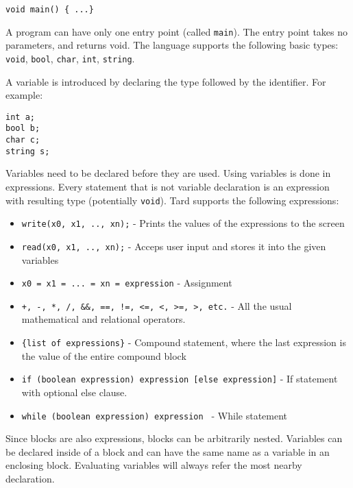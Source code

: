 \documentclass{report}
\begin{document}
\begin{center}
    \texttt{void main() \{ ...\} }
\end{center}

A program can have only one entry point (called \texttt{main}). The
entry point takes no parameters, and returns void. The language
supports the following basic types: \texttt{void}, \texttt{bool},
\texttt{char}, \texttt{int}, \texttt{string}.

A variable is introduced by declaring the type followed by the
identifier. For example:

\begin{center}
    \texttt{int a;\\bool b;\\char c;\\string s;\\}
\end{center}

Variables need to be declared before they are used. Using variables
is done in expressions. Every statement that is not variable
declaration is an expression with resulting type (potentially
\texttt{void}). Tard supports the following expressions:

\begin{itemize}
    \item \texttt{write(x0, x1, .., xn);} - Prints the values of the expressions to the screen
    \item \texttt{read(x0, x1, .., xn);} - Acceps user input and stores it into the given variables
    \item \texttt{x0 = x1 = ... = xn = expression} - Assignment
    \item \texttt{+, -, *, /, \&\&, ==, !=, <=, <, >=, >, etc.} - All the usual mathematical and relational operators.
    \item \texttt{\{list of expressions\}} - Compound statement, where the last expression is the value of the entire compound block
    \item \texttt{if (boolean expression) expression [else expression]} - If statement with optional else clause.
    \item \texttt{while (boolean expression) expression } - While statement
\end{itemize}

Since blocks are also expressions, blocks can be arbitrarily nested. Variables can be declared inside of a block
and can have the same name as a variable in an enclosing block. Evaluating variables will always refer the most
nearby declaration.
\end{document}
